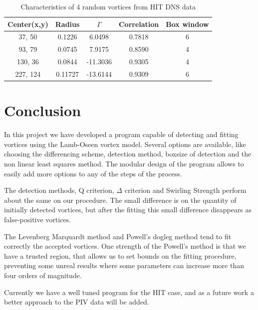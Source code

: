 \documentclass[12pt, a4paper, openany]{memoir}
\begin{document}
\begin{table}[h!]
	\centering
	\caption{Characteristics of 4 random vortices from HIT DNS data}
	\vspace{10px}
	\label{tb:DNSvortices}
	\begin{tabular}{c|c|c|c|c}
		 Center(x,y) & Radius    & $\Gamma$   & Correlation & Box window \\
		\hline
		 37, 50   & 0.1226  & 6.0498   & 0.7818 & 6 \\
		 93, 79   & 0.0745  & 7.9175   & 0.8590 & 4 \\
		 130, 36  & 0.0844  & -11.3036 & 0.9305 & 4\\
		 227, 124 & 0.11727 & -13.6144 & 0.9309 & 6
	\end{tabular}
\end{table}

\chapter{Conclusion}

In this project we have developed a program capable of detecting and fitting vortices using the Lamb-Oseen vortex model. Several options are available, like choosing the differencing scheme, detection method, boxsize of detection and the non linear least squares method. The modular design of the program allows to easily add more options to any of the steps of the process.

The detection methods, Q criterion, $\Delta$ criterion and Swirling Strength perform about the same on our procedure. The small difference is on the quantity of initially detected vortices, but after the fitting this small difference disappears as false-positive vortices.

The Levenberg Marquardt method and Powell's dogleg method tend to fit correctly the accepted vortices. One strength of the Powell's method is that we have a trusted region, that allows us to set bounds on the fitting procedure, preventing some unreal results where some parameters can increase more than four orders of magnitude.

Currently we have a well tuned program for the HIT case, and as a future work a better approach to the PIV data will be added.   


\end{document}
